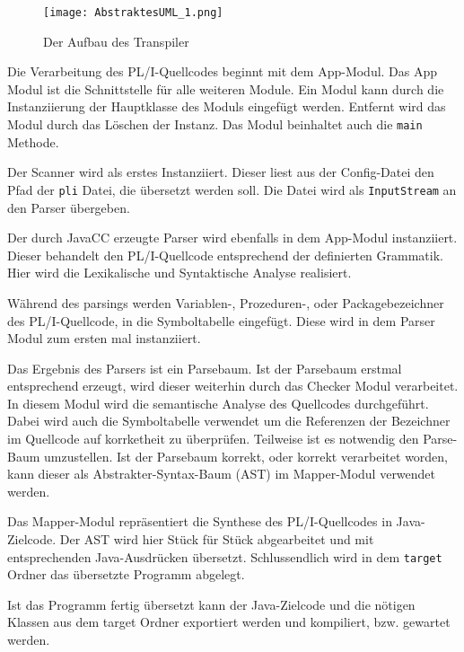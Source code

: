 \begin{figure}[h]
	\centering
	\caption{Der Aufbau des Transpiler}
	\texttt{[image: AbstraktesUML\_1.png]}
	\label{fig:modules}
\end{figure}

Die Verarbeitung des PL/I-Quellcodes beginnt mit dem App-Modul. Das App Modul ist die Schnittstelle für alle weiteren Module. Ein Modul kann durch die Instanziierung der Hauptklasse des Moduls eingefügt werden. Entfernt wird das Modul durch das Löschen der Instanz. Das Modul beinhaltet auch die \verb+main+ Methode.

Der Scanner wird als erstes Instanziiert. Dieser liest aus der Config-Datei den Pfad der \verb+pli+ Datei, die übersetzt werden soll. Die Datei wird als \verb+InputStream+ an den Parser übergeben.

Der durch JavaCC erzeugte Parser wird ebenfalls in dem App-Modul instanziiert. Dieser behandelt den PL/I-Quellcode entsprechend der definierten Grammatik. Hier wird die Lexikalische und Syntaktische Analyse realisiert.

Während des parsings werden Variablen-, Prozeduren-, oder Packagebezeichner des PL/I-Quellcode, in die Symboltabelle eingefügt. Diese wird in dem Parser Modul zum ersten mal instanziiert. 

Das Ergebnis des Parsers ist ein Parsebaum.
Ist der Parsebaum erstmal entsprechend erzeugt, wird dieser weiterhin durch das Checker Modul verarbeitet. In diesem Modul wird die semantische Analyse des Quellcodes durchgeführt. Dabei wird auch die Symboltabelle verwendet um die Referenzen der Bezeichner im Quellcode auf korrketheit zu überprüfen. Teilweise ist es notwendig den Parse-Baum umzustellen. Ist der Parsebaum korrekt, oder korrekt verarbeitet worden, kann dieser als Abstrakter-Syntax-Baum (AST) im Mapper-Modul verwendet werden.

Das Mapper-Modul repräsentiert die Synthese des PL/I-Quellcodes in Java-Zielcode. Der AST wird hier Stück für Stück abgearbeitet und mit entsprechenden Java-Ausdrücken übersetzt. Schlussendlich wird in dem \verb+target+ Ordner das übersetzte Programm abgelegt.
 
Ist das Programm fertig übersetzt kann der Java-Zielcode und die nötigen Klassen aus dem target Ordner exportiert werden und kompiliert, bzw. gewartet werden.

